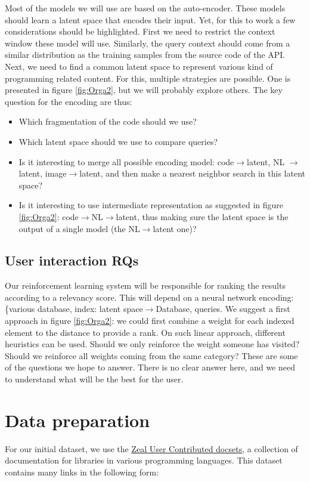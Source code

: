 \documentclass{article}
\begin{document}
\begin{multicols}{2}
Most of the models we will use are based on the auto-encoder. These models should learn a latent space that encodes their input. Yet, for this to work a few considerations should be highlighted. First we need to restrict the context window these model will use. Similarly, the query context should come from a similar distribution as the training samples from the source code of the API. Next, we need to find a common latent space to represent various kind of programming related content. For this, multiple strategies are possible. One is presented in figure \ref{fig:Orga2}, but we will probably explore others.
The key question for the encoding are thus:
\begin{itemize}
    \item Which fragmentation of the code should we use?
    \item Which latent space should we use to compare queries?
    \item Is it interesting to merge all possible encoding model: code$\xrightarrow{}$latent, NL $\xrightarrow{}$ latent, image$\xrightarrow{}$latent, and then make a nearest neighbor search in this latent space?
    \item Is it interesting to use intermediate representation as suggested in figure \ref{fig:Orga2}: code$\xrightarrow{}$NL$\xrightarrow{}$latent, thus making sure the latent space is the output of a single model (the NL$\xrightarrow{}$latent one)?
\end{itemize}

\subsection{User interaction RQs}

Our reinforcement learning system will be responsible for ranking the results according to a relevancy score. This will depend on a  neural network encoding: \{various database, index: latent space$\xrightarrow{}$Database, queries.
We suggest a first approach in figure \ref{fig:Orga2}: we could first combine a weight for each indexed element to the distance to provide a rank. On such linear approach, different heuristics can be used. Should we only reinforce the weight someone has visited? Should we reinforce all weights coming from the same category? These are some of the questions we hope to answer.
There is no clear answer here, and we need to understand what will be the best for the user.

\end{multicols}
\section{Data preparation}
For our initial dataset, we use the \href{https://zealusercontributions.now.sh/}{Zeal User Contributed docsets}, a collection of documentation for libraries in various programming languages. This dataset contains many links in the following form:
\end{document}
